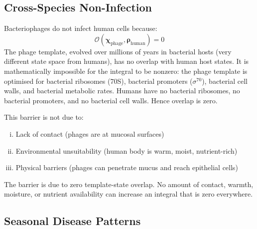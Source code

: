 \documentclass[11pt,twocolumn,a4paper]{article}
\newcommand{\Template}{\boldsymbol{\chi}}
\newcommand{\State}{\boldsymbol{\rho}}
\newcommand{\Overlap}{\mathcal{O}}
\begin{document}
\subsection{Cross-Species Non-Infection}

\begin{corollary}
\label{cor:cross_species}
Bacteriophages do not infect human cells because:
\begin{equation}
\Overlap(\Template_{\mathrm{phage}}, \State_{\mathrm{human}}) = 0
\label{eq:phage_human_overlap}
\end{equation}
The phage template, evolved over millions of years in bacterial hosts (very different state space from humans), has no overlap with human host states. It is mathematically impossible for the integral to be nonzero: the phage template is optimised for bacterial ribosomes (70S), bacterial promoters ($\sigma^{70}$), bacterial cell walls, and bacterial metabolic rates. Humans have no bacterial ribosomes, no bacterial promoters, and no bacterial cell walls. Hence overlap is zero.

This barrier is not due to:
\begin{enumerate}[(i)]
\item Lack of contact (phages are at mucosal surfaces)
\item Environmental unsuitability (human body is warm, moist, nutrient-rich)
\item Physical barriers (phages can penetrate mucus and reach epithelial cells)
\end{enumerate}
The barrier is due to zero template-state overlap. No amount of contact, warmth, moisture, or nutrient availability can increase an integral that is zero everywhere.
\end{corollary}

\subsection{Seasonal Disease Patterns}
\end{document}
